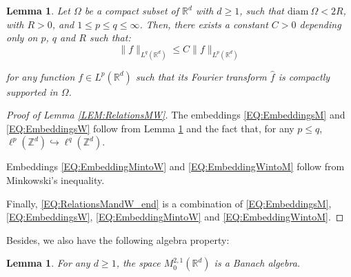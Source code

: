 \documentclass[letterpaper, 11pt,  reqno]{amsart}
\newtheorem{lemma}[theorem]{Lemma}
\newcommand{\1}{\hspace{0.5mm}\text{I}\hspace{0.5mm}}
\newcommand{\noi}{\noindent}
\newcommand{\Z}{\mathbb{Z}}
\newcommand{\R}{\mathbb{R}}
\newcommand{\embeds}{\hookrightarrow}
\renewcommand{\O}{\Omega}
\numberwithin{equation}{section}
\numberwithin{theorem}{section}
\begin{document}
\begin{lemma}
\label{LEM:lem6.1}
Let $\O$ be a compact subset of $\R^d$ with $d \geq 1$, such that $\mathrm{diam} \ \O < 2R$, with $R > 0$, and $1 \leq p \leq q \leq \infty$. Then, there exists a constant $C > 0$ depending only on $p$, $q$ and $R$ such that:
$$
\| f \|_{L^q (\R^d)} \leq C \| f \|_{L^p (\R^d)}
$$

\noi for any function $f \in L^p (\R^d)$ such that its Fourier transform $\widehat{f}$ is compactly supported in $\O$.
\end{lemma}

\begin{proof}[Proof of Lemma \ref{LEM:RelationsMW}]
The embeddings \eqref{EQ:EmbeddingsM} and \eqref{EQ:EmbeddingsW} follow from Lemma \ref{LEM:lem6.1} and the fact that, for any $p \leq q$, $\ell^{p} (\Z^d) \embeds \ell^{q} (\Z^d)$. 

Embeddings \eqref{EQ:EmbeddingMintoW} and \eqref{EQ:EmbeddingWintoM} follow from Minkowski's inequality. 

Finally, \eqref{EQ:RelationsMandW_end} is a combination of \eqref{EQ:EmbeddingsM}, \eqref{EQ:EmbeddingsW}, \eqref{EQ:EmbeddingMintoW}  and \eqref{EQ:EmbeddingWintoM}.
\end{proof}

\noi Besides, we also have the following algebra property:

\begin{lemma}
\label{LEM:algebraM21}
For any $d \geq 1$, the space $M^{2,1}_0 (\R^d)$ is a Banach algebra.
\end{lemma}
\end{document}
